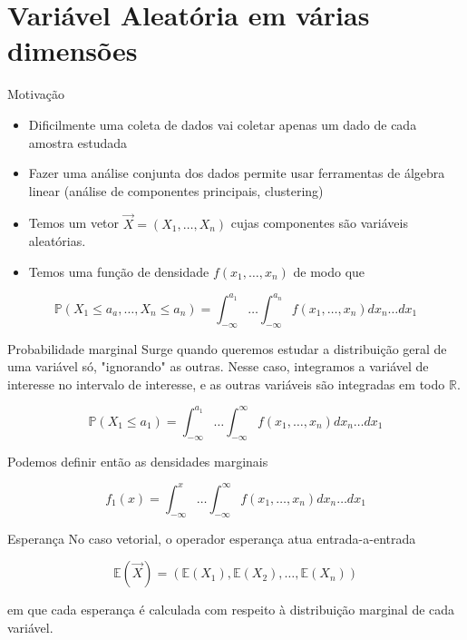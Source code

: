 \documentclass[
  ignorenonframetext,
  aspectratio=169,
]{beamer}
\providecommand{\tightlist}{%
  \setlength{\itemsep}{0pt}\setlength{\parskip}{0pt}}
\newcommand{\PP}{\mathbb{P}}
\newcommand{\EE}{\mathbb{E}}
\newcommand{\RR}{\mathbb{R}}
\newcommand{\vX}{\vec{X}}
\begin{document}
\section{Variável Aleatória em várias dimensões}

\begin{frame}{Motivação}
\begin{itemize}
\tightlist
\item
  Dificilmente uma coleta de dados vai coletar apenas um dado de cada
  amostra estudada
\item
  Fazer uma análise conjunta dos dados permite usar ferramentas de
  álgebra linear (análise de componentes principais, clustering)
\end{itemize}
\end{frame}

\begin{frame}
\begin{itemize}
\tightlist
\item
  Temos um vetor \(\vX = (X_1, \ldots, X_n)\) cujas componentes são
  variáveis aleatórias.
\item
  Temos uma função de densidade \(f(x_1,\ldots, x_n)\) de modo que
\end{itemize}

\[\PP(X_1 \le a_a, \ldots, X_n \le a_n) = \int_{-\infty}^{a_1}\ldots\int_{-\infty}^{a_n} f(x_1,\ldots,x_n) dx_n\ldots dx_1 \]
\end{frame}

\begin{frame}{Probabilidade marginal}
Surge quando queremos estudar a distribuição geral de uma variável só,
"ignorando" as outras. Nesse caso, integramos a variável de interesse no
intervalo de interesse, e as outras variáveis são integradas em todo
\(\RR\).

\[\PP(X_1 \le a_1)  = \int_{-\infty}^{a_1}\ldots\int_{-\infty}^{\infty} f(x_1,\ldots,x_n) dx_n\ldots dx_1\]

Podemos definir então as densidades marginais

\[f_1(x) =  \int_{-\infty}^{x}\ldots\int_{-\infty}^{\infty} f(x_1,\ldots,x_n) dx_n\ldots dx_1\]
\end{frame}

\begin{frame}{Esperança}
No caso vetorial, o operador esperança atua entrada-a-entrada

\[\EE(\vX) = (\EE(X_1), \EE(X_2),\ldots, \EE(X_n))\]

em que cada esperança é calculada com respeito à distribuição marginal
de cada variável.
\end{frame}
\end{document}
